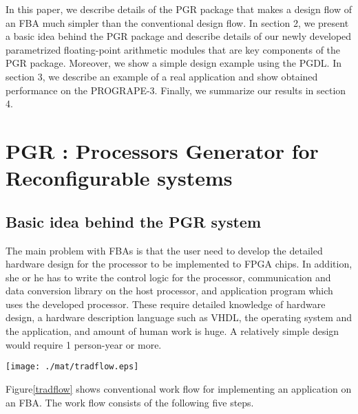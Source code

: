 \documentclass{llncs}
\begin{document}



In this paper, we describe details of the PGR package
that makes a design flow of an FBA much simpler than
the conventional design flow.
In section 2, we present a basic idea behind the PGR package
and describe details of our newly developed parametrized 
floating-point arithmetic modules that are key components of the PGR package.
Moreover, we show a simple design example using the PGDL.
In section 3, we describe an example of a real application 
and show obtained performance on the PROGRAPE-3.
Finally, we summarize our results in section 4.
%
\section{PGR : Processors Generator for Reconfigurable systems}
\subsection{Basic idea behind the PGR system}


The main problem with FBAs is that the user need to
develop the detailed hardware design for the processor to be
implemented to FPGA chips. In addition, she or he has to write the
control logic for the processor, communication and data conversion
library on the host processor, and application program which uses the
developed processor. These require detailed knowledge of hardware
design, a hardware description language such as VHDL, the operating
system and the application, and amount of human work is huge. A
relatively simple design would require 1 person-year or more.

\begin{figure*}[htb]
\begin{center}
\texttt{[image: ./mat/tradflow.eps]}
\caption{Conventional work flow for implementing an application on a FBA system.}
\label{tradflow}
\end{center}
\end{figure*}

Figure\ref{tradflow} shows conventional work flow for implementing an application on an FBA.
The work flow consists of the following five steps.
\end{document}

